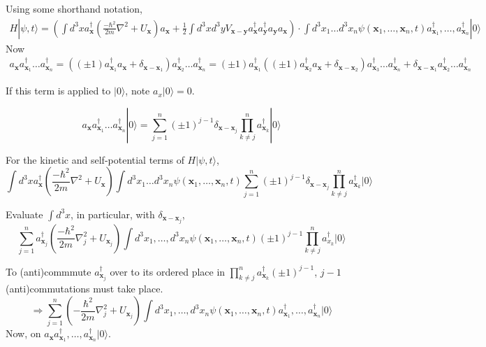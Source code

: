 \documentclass[twoside]{amsart}
\begin{document}
Using some shorthand notation,
\[
\begin{gathered}
  H | \psi,t \rangle = \left( \int d^3x a^{\dag}_{\mathbf{x}} \left( \frac{- \hbar^2}{2m } \nabla^2 + U_{\mathbf{x}} \right) a_{\mathbf{x}} + \frac{1}{2} \int d^3x d^3y V_{\mathbf{x} - \mathbf{y}} a^{\dag}_{ \mathbf{x} }a^{\dag}_{\mathbf{y}} a_{\mathbf{y}}a_{\mathbf{x}} \right) \cdot  \int d^3x_1 \dots d^3x_n \psi(\mathbf{x}_1, \dots , \mathbf{x}_n, t) a^{\dag}_{\mathbf{x}_1 }, \dots, a^{\dag}_{\mathbf{x}_n } | 0 \rangle
\end{gathered}
\]
Now 
\[
\begin{gathered}
  a_{\mathbf{x}}a^{\dag}_{\mathbf{x}_1} \dots a^{\dag}_{\mathbf{x}_n} = ((\pm 1) a^{\dag}_{\mathbf{x}_1} a_{\mathbf{x}} + \delta_{\mathbf{x}- \mathbf{x}_1} ) a^{\dag}_{\mathbf{x}_2} \dots a^{\dag}_{\mathbf{x}_n} =  (\pm 1) a^{\dag}_{\mathbf{x}_1} ( ( \pm 1) a^{\dag}_{\mathbf{x}_2} a_{\mathbf{x}} + \delta_{\mathbf{x} - \mathbf{x}_2} ) a^{\dag}_{\mathbf{x}_3} \dots a^{\dag}_{\mathbf{x}_n} + \delta_{\mathbf{x} - \mathbf{x}_1} a^{\dag}_{\mathbf{x}_2} \dots a^{\dag}_{\mathbf{x}_n }
\end{gathered}
\]

If this term is applied to $|0 \rangle$, note $a_x |0 \rangle =0$.  

\[
a_{\mathbf{x}} a^{\dag}_{\mathbf{x}_1} \dots a^{\dag}_{\mathbf{x}_n} | 0 \rangle = \sum_{j=1}^n (\pm 1)^{j-1} \delta_{\mathbf{x} - \mathbf{x}_j} \prod_{k\neq j}^n a_{\mathbf{x}_k}^{\dag} | 0 \rangle
\]

For the kinetic and self-potential terms of $H | \psi, t \rangle$, 
\[
\int d^3x a^{\dag}_{\mathbf{x}}  \left( \frac{ - \hbar^2}{2m } \nabla^2 + U_{\mathbf{x}} \right) \int d^3x_1 \dots d^3x_n \psi(\mathbf{x}_1, \dots, \mathbf{x}_n, t ) \sum_{j=1}^n (\pm 1)^{j-1} \delta_{\mathbf{x} - \mathbf{x}_j} \prod_{k\neq j}^n a^{\dag}_{\mathbf{x}_k} |  0 \rangle
\]

Evaluate $\int d^3x$, in particular, with $\delta_{\mathbf{x} - \mathbf{x}_j}$, 
\[
 \sum_{j=1}^n a^{\dag}_{\mathbf{x}_j} \left( \frac{ - \hbar^2 }{ 2m } \nabla_j^2 + U_{\mathbf{x}_j } \right) \int d^3x_1, \dots , d^3x_n \psi(\mathbf{x}_1, \dots, \mathbf{x}_n , t ) (\pm 1)^{j-1} \prod_{k\neq j }^n a^{\dag}_{x_k } | 0 \rangle
\]

To (anti)commmute $a^{\dag}_{\mathbf{x}_j}$ over to its ordered place in $\prod_{k\neq j}^n a^{\dag}_{\mathbf{x}_k}( \pm 1)^{j-1}$, $j-1$ (anti)commutations must take place.  
\[
\Longrightarrow \sum_{j=1}^n \left(  - \frac{ \hbar^2}{2m } \nabla_j^2 + U_{\mathbf{x}_j} \right) \int d^3x_1, \dots , d^3x_n \psi(\mathbf{x}_1, \dots, \mathbf{x}_n, t) a^{\dag}_{\mathbf{x}_1}, \dots , a^{\dag}_{\mathbf{x}_n} | 0 \rangle 
\]
Now, on $a_{\mathbf{x}} a^{\dag}_{\mathbf{x}_1} , \dots, a^{\dag}_{\mathbf{x}_n} | 0 \rangle $.  
\end{document}
